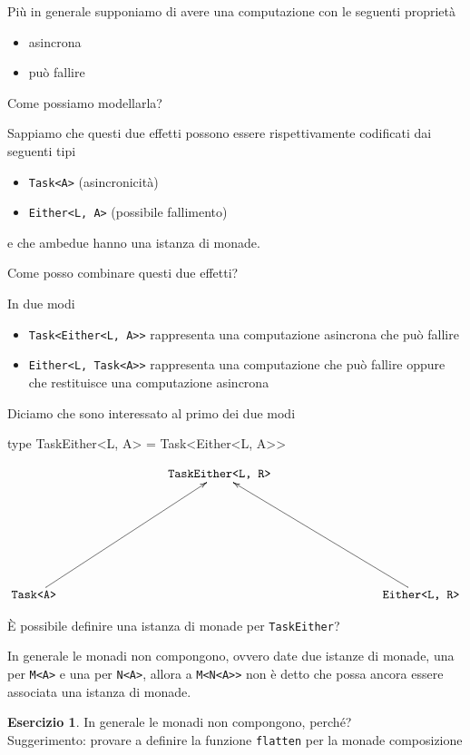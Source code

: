 \documentclass[12pt]{article}
\theoremstyle{definition}
\newtheorem{exercise}{Esercizio}[section]
\newenvironment{code}
  {\vspace{0.5cm} \VerbatimEnvironment\begin{typescriptcode}}
  {\end{typescriptcode} \vspace{0.2cm}}
\begin{document}
Più in  generale supponiamo di avere una computazione con le seguenti proprietà

\begin{itemize}
\item asincrona
\item può fallire
\end{itemize}

Come possiamo modellarla?

Sappiamo che questi due effetti possono essere rispettivamente codificati dai seguenti tipi

\begin{itemize}
\item \texttt{Task<A>} (asincronicità)
\item \texttt{Either<L, A>} (possibile fallimento)
\end{itemize}

e che ambedue hanno una istanza di monade.

Come posso combinare questi due effetti?

In due modi

\begin{itemize}
\item \texttt{Task<Either<L, A>>} rappresenta una computazione asincrona che può fallire
\item \texttt{Either<L, Task<A>>} rappresenta una computazione che può fallire oppure che restituisce una computazione asincrona
\end{itemize}

Diciamo che sono interessato al primo dei due modi

\begin{code}
type TaskEither<L, A> = Task<Either<L, A>>
\end{code}

\[
\xymatrixrowsep{3cm}
\xymatrixcolsep{3cm}
\xymatrix{
  & \texttt{TaskEither<L, R>} \\
  \texttt{Task<A>} \ar[ur] & & \texttt{Either<L, R>} \ar[ul] \\
}
\]

È possibile definire una istanza di monade per \texttt{TaskEither}?

In generale le monadi non compongono, ovvero date due istanze di monade, una per \texttt{M<A>} e una per \texttt{N<A>},
allora a \texttt{M<N<A>>} non è detto che possa ancora essere associata una istanza di monade.

\begin{exercise}
In generale le monadi non compongono, perché? \\
Suggerimento: provare a definire la funzione \texttt{flatten} per la monade composizione
\end{exercise}
\end{document}
